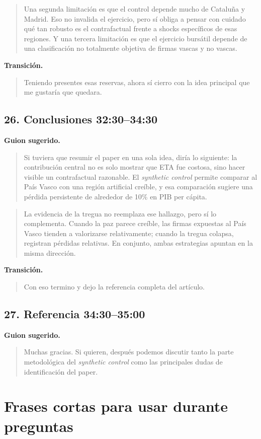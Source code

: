 \documentclass[11pt]{article}
\newcommand{\slideentry}[2]{\subsection*{#1 \hfill #2}}
\begin{document}
\begin{quote}
Una segunda limitación es que el control depende mucho de Cataluña y Madrid. Eso no invalida el ejercicio, pero sí obliga a pensar con cuidado qué tan robusto es el contrafactual frente a shocks específicos de esas regiones. Y una tercera limitación es que el ejercicio bursátil depende de una clasificación no totalmente objetiva de firmas vascas y no vascas.
\end{quote}

\textbf{Transición.}
\begin{quote}
Teniendo presentes esas reservas, ahora sí cierro con la idea principal que me gustaría que quedara.
\end{quote}

\slideentry{26. Conclusiones}{32:30--34:30}

\textbf{Guion sugerido.}
\begin{quote}
Si tuviera que resumir el paper en una sola idea, diría lo siguiente: la contribución central no es solo mostrar que ETA fue costosa, sino hacer visible un contrafactual razonable. El \emph{synthetic control} permite comparar al País Vasco con una región artificial creíble, y esa comparación sugiere una pérdida persistente de alrededor de 10\% en PIB per cápita.
\end{quote}

\begin{quote}
La evidencia de la tregua no reemplaza ese hallazgo, pero sí lo complementa. Cuando la paz parece creíble, las firmas expuestas al País Vasco tienden a valorizarse relativamente; cuando la tregua colapsa, registran pérdidas relativas. En conjunto, ambas estrategias apuntan en la misma dirección.
\end{quote}

\textbf{Transición.}
\begin{quote}
Con eso termino y dejo la referencia completa del artículo.
\end{quote}

\slideentry{27. Referencia}{34:30--35:00}

\textbf{Guion sugerido.}
\begin{quote}
Muchas gracias. Si quieren, después podemos discutir tanto la parte metodológica del \emph{synthetic control} como las principales dudas de identificación del paper.
\end{quote}

\clearpage

\section*{Frases cortas para usar durante preguntas}
\end{document}
